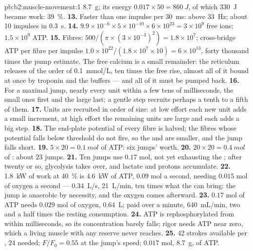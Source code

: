 \begin{solution}{pb:b2:muscle-movement:1}
\qty{8.7}{g}; its energy $0.017\times 50 = \qty{860}{J}$, of which
\qty{330}{J} became work: \qty{39}{\%}.
\textbf{13.} Faster than one impulse per \qty{30}{ms}: above
\qty{33}{Hz}; about 10 impulses in \qty{0.3}{s}.
\textbf{14.} $9.9\times 10^{-6}\times 5\times 10^{-10}\times 6\times
10^{23} = 3\times 10^{9}$ free ions; $1.5\times 10^{9}$ ATP.
\textbf{15.} Fibres: $500/(\pi\times(3\times 10^{-3})^{2}) = 1.8\times
10^{7}$; cross-bridge ATP per fibre per impulse $1.0\times
10^{22}/(1.8\times 10^{7}\times 10) = 6\times 10^{13}$, forty thousand
times the pump estimate. The free calcium is a small remainder: the
reticulum releases of the order of \qty{0.1}{mmol/L}, ten
times the free rise, almost all of it bound at once by troponin and
the buffers --- and all of it must be pumped back.
\textbf{16.} For a maximal jump, nearly every unit within a few tens
of milliseconds, the small ones first and the large last; a gentle
step recruits perhaps a tenth to a fifth of them.
\textbf{17.} Units are recruited in order of size: at low effort each
new unit adds a small increment, at high effort the remaining units
are large and each adds a big step.
\textbf{18.} The end-plate potential of every fibre is halved; the
fibres whose potential falls below threshold do not fire, so the
 and  are smaller, and the jump falls short.
\textbf{19.} $5\times 20 = \qty{0.1}{mol}$ of ATP: six jumps' worth.
\textbf{20.} $20\times 20 = \qty{0.4}{mol}$ of :
about 23 jumps.
\textbf{21.} Ten jumps use $0.17$ mol, not yet exhausting the ; after twenty or so, glycolysis takes over, and lactate
and protons accumulate.
\textbf{22.} \qty{1.8}{kW} of work at \qty{40}{\%} is \qty{4.6}{kW} of
ATP, $0.09$ mol a second, needing $0.015$ mol of oxygen a second ---
\qty{0.34}{L/s}, \qty{21}{L/min}, ten times what the  can bring:
the jump is anaerobic by necessity, and the oxygen comes afterward.
\textbf{23.} $0.17$ mol of ATP needs $0.029$ mol of oxygen,
\qty{0.64}{L}; paid over a minute, \qty{640}{mL/min}, two and a half
times the resting consumption.
\textbf{24.} ATP is rephosphorylated from  within
milliseconds, so its concentration barely falls; rigor needs ATP
near zero, which a living muscle with any reserve never reaches.
\textbf{25.} 42 strokes available per , 24 needed;
$F/F_0 = 0.55$ at the jump's speed; $0.017$ mol, \qty{8.7}{g}, of ATP.
\end{solution}
